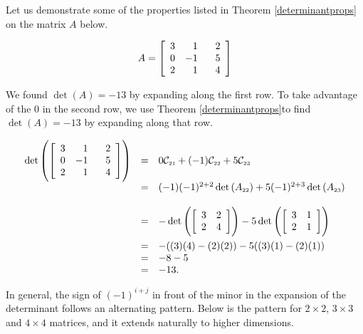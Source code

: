\smallskip

Let us demonstrate some of the properties listed in Theorem \ref{determinantprops} on the matrix $A$ below.

\[A =  \left[ \begin{array}{rrr} 3 & 1 & \hphantom{-}2 \\ 0 & -1 & 5 \\ 2 & 1 & 4 \\ \end{array} \right] \]

We found $\det(A) = -13$ by expanding along the first row.  To take advantage of the $0$ in the second row, we use Theorem \ref{determinantprops}to find $\det(A) = -13$ by expanding along that row.

\[ \begin{array}{rcl} 

\det \left( \left[ \begin{array}{rrr} 3 & 1 & \hphantom{-}2 \\ 0 & -1 & 5 \\ 2 & 1 & 4 \\ \end{array} \right] \right)& = & 0\mathcal{C}_{\mbox{\tiny$21$}} + (-1)\mathcal{C}_{\mbox{\tiny$22$}}+5\mathcal{C}_{\mbox{\tiny$23$}} \\

& = &  (-1) (-1)^{2+2} \det\left(A_{\mbox{\tiny$22$}}\right) + 5 (-1)^{2+3}\det\left(A_{\mbox{\tiny$23$}}\right) \\[13pt]

& = & - \det \left( \left[ \begin{array}{rr} 3 & 2 \\ 2 & 4 \\ \end{array} \right] \right) -5 \det \left( \left[ \begin{array}{rr} 3 & 1 \\ 2 & 1 \\ \end{array} \right] \right) \\[13pt]
& = & -((3)(4)-(2)(2)) - 5((3)(1)-(2)(1)) \\
& = & -8-5 \\
& = & -13. \\ \end{array}  \]

In general, the sign of $(-1)^{i+j}$ in front of the minor in the expansion of the determinant follows an alternating pattern. Below is the pattern for $2 \times 2$, $3 \times 3$ and $4 \times 4$ matrices, and it extends naturally to higher dimensions.  

